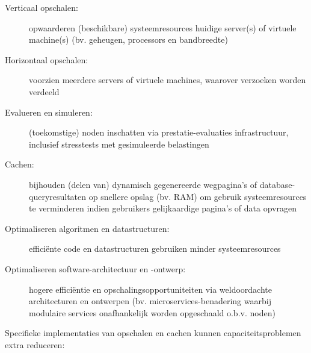 \begin{description}
    \item [Verticaal opschalen:] opwaarderen (beschikbare)
    systeemresources huidige server(s) of virtuele machine(s)
    (bv. geheugen, processors en bandbreedte)
    \cite{lu2014applicationdriven, michael2007scaleup, appuswamy2013scaleup}

    \item [Horizontaal opschalen:] voorzien meerdere servers of virtuele
    machines, waarover verzoeken worden verdeeld
    \cite{lu2014applicationdriven, michael2007scaleup}

    \item [Evalueren en simuleren:] (toekomstige) noden inschatten
    via prestatie-evaluaties infrastructuur, inclusief
    stresstests met gesimuleerde belastingen
    \cite{penaortiz2015generating, penaortiz2013analyzing, penaortiz2015new}

    \item [Cachen:] bijhouden (delen van) dynamisch gegenereerde wegpagina's
    of database-queryresultaten op snellere opslag (bv. RAM)
    om gebruik systeemresources te verminderen indien gebruikers
    gelijkaardige pagina's of data opvragen
    \cite{sivasubramanian2007analysis,amazon2023whatiscaching}
    
    \item [Optimaliseren algoritmen en datastructuren:] efficiënte code en
    datastructuren gebruiken minder systeemresources
    \cite{feitelson2015introduction}

    \item [Optimaliseren software-architectuur en -ontwerp:] hogere
    efficiëntie \cite{feitelson2015introduction} en
    opschalingsopportuniteiten via weldoordachte
    architecturen en ontwerpen (bv. microservices-benadering waarbij modulaire
    services onafhankelijk worden opgeschaald o.b.v. noden)
    \cite{coulson2020adaptive, thones2015microservices}

\end{description}

Specifieke implementaties van opschalen en cachen kunnen capaciteitsproblemen
extra reduceren:

